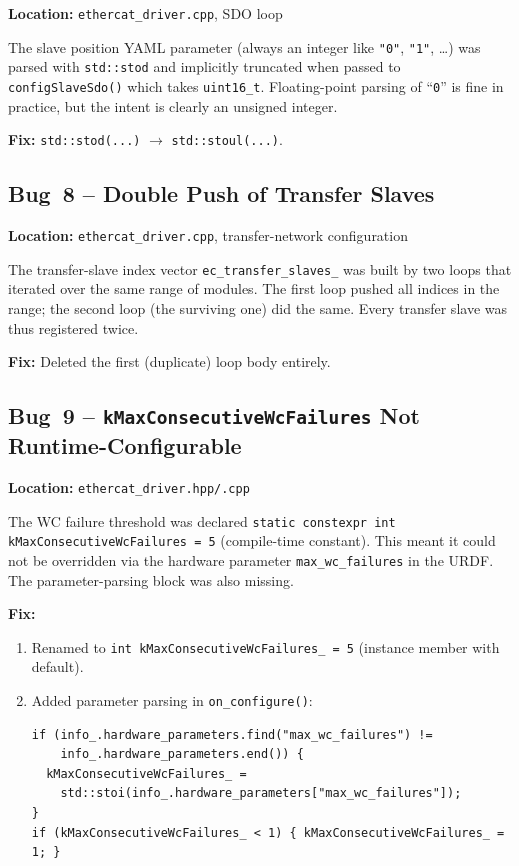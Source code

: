\documentclass[11pt,a4paper]{article}
\begin{document}
\textbf{Location:} \texttt{ethercat\_driver.cpp}, SDO loop

The slave position YAML parameter (always an integer like \texttt{"0"},
\texttt{"1"}, \ldots) was parsed with \texttt{std::stod} and implicitly
truncated when passed to \texttt{configSlaveSdo()} which takes
\texttt{uint16\_t}.  Floating-point parsing of ``\texttt{0}'' is fine in
practice, but the intent is clearly an unsigned integer.

\textbf{Fix:} \texttt{std::stod(...)} $\to$ \texttt{std::stoul(...)}.

\subsection{Bug~8 -- Double Push of Transfer Slaves}
\label{sec:bug8}

\textbf{Location:} \texttt{ethercat\_driver.cpp}, transfer-network
configuration

The transfer-slave index vector \texttt{ec\_transfer\_slaves\_} was built by
two loops that iterated over the same range of modules.  The first loop
pushed all indices in the range; the second loop (the surviving one) did the
same.  Every transfer slave was thus registered twice.

\textbf{Fix:} Deleted the first (duplicate) loop body entirely.

\subsection{Bug~9 -- \texttt{kMaxConsecutiveWcFailures} Not Runtime-Configurable}
\label{sec:bug9}

\textbf{Location:} \texttt{ethercat\_driver.hpp/.cpp}

The WC failure threshold was declared \texttt{static constexpr int
kMaxConsecutiveWcFailures = 5} (compile-time constant).  This meant it could
not be overridden via the hardware parameter \texttt{max\_wc\_failures} in
the URDF.  The parameter-parsing block was also missing.

\textbf{Fix:}
\begin{enumerate}[nosep]
  \item Renamed to \texttt{int kMaxConsecutiveWcFailures\_ = 5} (instance
        member with default).
  \item Added parameter parsing in \texttt{on\_configure()}:
\begin{lstlisting}
if (info_.hardware_parameters.find("max_wc_failures") !=
    info_.hardware_parameters.end()) {
  kMaxConsecutiveWcFailures_ =
    std::stoi(info_.hardware_parameters["max_wc_failures"]);
}
if (kMaxConsecutiveWcFailures_ < 1) { kMaxConsecutiveWcFailures_ = 1; }
\end{lstlisting}
\end{enumerate}
\end{document}
